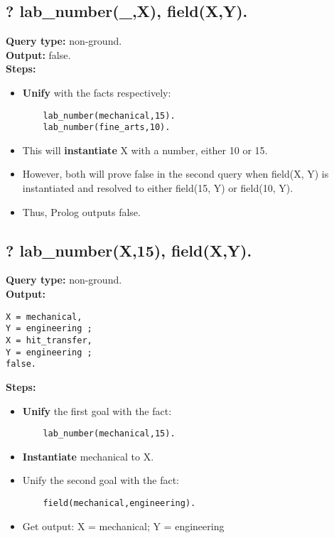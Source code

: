 \subsection{? lab\_number(\_,X), field(X,Y).}
\textbf{Query type: } non-ground. \\
\textbf{Output:} false. \\
\textbf{Steps:}
\begin{itemize}
    \item \textbf{Unify} with the facts respectively:
    \begin{lstlisting}
    lab_number(mechanical,15).
    lab_number(fine_arts,10).  
    \end{lstlisting}
\item This will \textbf{instantiate} X with a number, either 10 or 15.
\item However, both will prove false in the second query when field(X, Y) is instantiated and resolved to either field(15, Y) or field(10, Y).
\item Thus, Prolog outputs false.
\end{itemize}

\newpage
\subsection{? lab\_number(X,15), field(X,Y).}
\textbf{Query type: } non-ground. \\
\textbf{Output:} \\
\begin{lstlisting}
X = mechanical,
Y = engineering ;
X = hit_transfer,
Y = engineering ;
false.
\end{lstlisting}

\textbf{Steps:}
\begin{itemize}
    \item \textbf{Unify} the first goal with the fact:
    \begin{lstlisting}
    lab_number(mechanical,15).
    \end{lstlisting}
    \item \textbf{Instantiate} mechanical to X.
    \item Unify the second goal with the fact:
    \begin{lstlisting}
    field(mechanical,engineering).
    \end{lstlisting}
\item Get output: X = mechanical; Y = engineering
\end{itemize}


